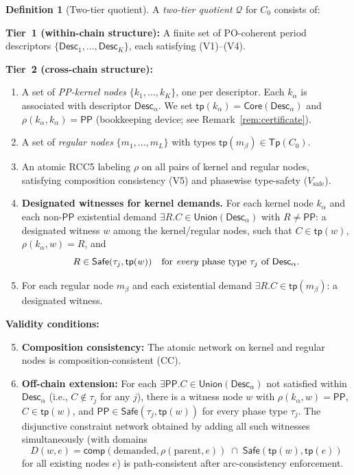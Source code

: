 \documentclass[a4paper,11pt]{article}
\theoremstyle{definition}
\newtheorem{definition}[theorem]{Definition}
\newcommand{\PP}{\ensuremath{\mathsf{PP}}}
\newcommand{\comp}{\ensuremath{\mathsf{comp}}}
\newcommand{\tp}{\ensuremath{\mathsf{tp}}}
\newcommand{\Tp}{\ensuremath{\mathsf{Tp}}}
\newcommand{\Desc}{\ensuremath{\mathsf{Desc}}}
\newcommand{\Core}{\ensuremath{\mathsf{Core}}}
\newcommand{\Union}{\ensuremath{\mathsf{Union}}}
\newcommand{\Safe}{\ensuremath{\mathsf{Safe}}}
\begin{document}
\begin{definition}[Two-tier quotient]\label{def:quotient}
A \emph{two-tier quotient} $\mathcal{Q}$ for $C_0$ consists of:

\medskip\noindent\textbf{Tier~1 (within-chain structure):}
A finite set of PO-coherent period descriptors
$\{\Desc_1, \ldots, \Desc_K\}$, each satisfying (V1)--(V4).

\medskip\noindent\textbf{Tier~2 (cross-chain structure):}
\begin{enumerate}[label=(T\arabic*)]
\item A set of \emph{PP-kernel nodes}
  $\{k_1, \ldots, k_K\}$, one per descriptor.
  Each $k_\alpha$ is associated with descriptor $\Desc_\alpha$.
  We set $\tp(k_\alpha) = \Core(\Desc_\alpha)$ and
  $\rho(k_\alpha, k_\alpha) = \PP$ (bookkeeping device; see
  Remark~\ref{rem:certificate}).
\item A set of \emph{regular nodes} $\{m_1, \ldots, m_L\}$ with
  types $\tp(m_\beta) \in \Tp(C_0)$.
\item An atomic RCC5 labeling $\rho$ on all pairs of
  kernel and regular nodes, satisfying composition consistency (V5)
  and phasewise type-safety ($V_{\mathrm{safe}}$).
\item \textbf{Designated witnesses for kernel demands.}\;
  For each kernel node $k_\alpha$ and each non-$\PP$ existential
  demand $\exists R.C \in \Union(\Desc_\alpha)$ with
  $R \ne \PP$: a designated witness $w$ among the kernel/regular
  nodes, such that $C \in \tp(w)$,
  $\rho(k_\alpha, w) = R$, and
  \begin{equation}\label{eq:t4-allphase}
  R \in \Safe(\tau_j, \tp(w)) \quad\text{for \emph{every} phase
  type $\tau_j$ of $\Desc_\alpha$}.
  \end{equation}
\item For each regular node $m_\beta$ and each existential demand
  $\exists R.C \in \tp(m_\beta)$: a designated witness.
\end{enumerate}

\medskip\noindent\textbf{Validity conditions:}
\begin{enumerate}[label=(V\arabic*),start=5]
\setcounter{enumi}{4}
\item \textbf{Composition consistency:} The atomic network on
  kernel and regular nodes is composition-consistent (CC).
\item \textbf{Off-chain extension:} For each
  $\exists\PP.C \in \Union(\Desc_\alpha)$
  not satisfied within $\Desc_\alpha$ (i.e., $C \notin \tau_j$ for
  any $j$), there is a witness node $w$ with
  $\rho(k_\alpha, w) = \PP$, $C \in \tp(w)$, and
  $\PP \in \Safe(\tau_j, \tp(w))$ for every phase type $\tau_j$.
  The disjunctive constraint network obtained by adding all such
  witnesses simultaneously (with domains
  \begin{equation}\label{eq:v6-domain}
  D(w, e) = \comp(\text{demanded}, \rho(\text{parent}, e)) \;\cap\;
  \Safe(\tp(w), \tp(e))
  \end{equation}
  for all existing nodes $e$) is path-consistent after
  arc-consistency enforcement.
\end{enumerate}


\end{definition}
\end{document}
